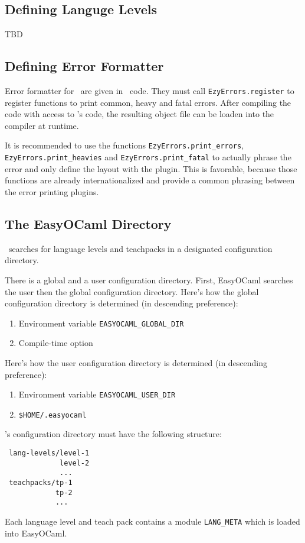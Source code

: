 \subsection{Defining Languge Levels}
TBD

\subsection{Defining Error Formatter}

Error formatter for \easyocaml\ are given in \ocaml\ code. They must call
\texttt{EzyErrors.register} to register functions to print common, heavy and
fatal errors. After compiling the code with access to \easyocaml's code, the
resulting object file can be loaden into the compiler at runtime.

It is recommended to use the functions \texttt{EzyErrors.print\_errors},
\texttt{EzyErrors.print\_heavies} and \texttt{EzyErrors.print\_fatal} to
actually phrase the error and only define the layout with the plugin. This is
favorable, because those functions are already internationalized and provide a
common phrasing between the error printing plugins.

\subsection{The EasyOCaml Directory}
\label{sec:directory}

\easyocaml\ searches for language levels and teachpacks in a designated
configuration directory.

There is a global and a user configuration directory. First, EasyOCaml 
searches the user then the global configuration directory.  Here's how 
the global configuration directory is determined (in descending 
preference):

\begin{enumerate}
    \item Environment variable \texttt{EASYOCAML\_GLOBAL\_DIR}
    \item Compile-time option
\end{enumerate}

Here's how the user configuration directory is determined (in descending 
preference):

\begin{enumerate}
    \item Environment variable \texttt{EASYOCAML\_USER\_DIR}
    \item \texttt{\$HOME/.easyocaml}
\end{enumerate}

\easyocaml's configuration directory must have the following structure:

\begin{verbatim}
 lang-levels/level-1
             level-2
             ...
 teachpacks/tp-1
            tp-2
            ...
\end{verbatim}

Each language level and teach pack contains a module \texttt{LANG\_META} 
which is loaded into EasyOCaml.

